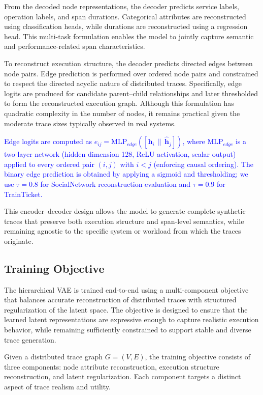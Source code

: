 \documentclass[sigconf,review]{acmart}
\begin{document}
From the decoded node representations, the decoder predicts service labels, operation labels, and span durations. Categorical attributes are reconstructed using classification heads, while durations are reconstructed using a regression head. This multi-task formulation enables the model to jointly capture semantic and performance-related span characteristics.

To reconstruct execution structure, the decoder predicts directed edges between node pairs. Edge prediction is performed over ordered node pairs and constrained to respect the directed acyclic nature of distributed traces. Specifically, edge logits are produced for candidate parent--child relationships and later thresholded to form the reconstructed execution graph. Although this formulation has quadratic complexity in the number of nodes, it remains practical given the moderate trace sizes typically observed in real systems.

\textcolor{blue}{Edge logits are computed as $e_{ij} = \text{MLP}_{edge}([\hat{\mathbf{h}}_i \,\|\, \hat{\mathbf{h}}_j])$, where $\text{MLP}_{edge}$ is a two-layer network (hidden dimension 128, ReLU activation, scalar output) applied to every ordered pair $(i,j)$ with $i < j$ (enforcing causal ordering). The binary edge prediction is obtained by applying a sigmoid and thresholding; we use $\tau=0.8$ for SocialNetwork reconstruction evaluation and $\tau=0.9$ for TrainTicket.}

This encoder--decoder design allows the model to generate complete synthetic traces that preserve both execution structure and span-level semantics, while remaining agnostic to the specific system or workload from which the traces originate.




\subsection{Training Objective}
\label{sec:training}

The hierarchical VAE is trained end-to-end using a multi-component objective that balances accurate reconstruction of distributed traces with structured regularization of the latent space. The objective is designed to ensure that the learned latent representations are expressive enough to capture realistic execution behavior, while remaining sufficiently constrained to support stable and diverse trace generation.

Given a distributed trace graph $G = (V, E)$, the training objective consists of three components: node attribute reconstruction, execution structure reconstruction, and latent regularization. Each component targets a distinct aspect of trace realism and utility.
\end{document}
